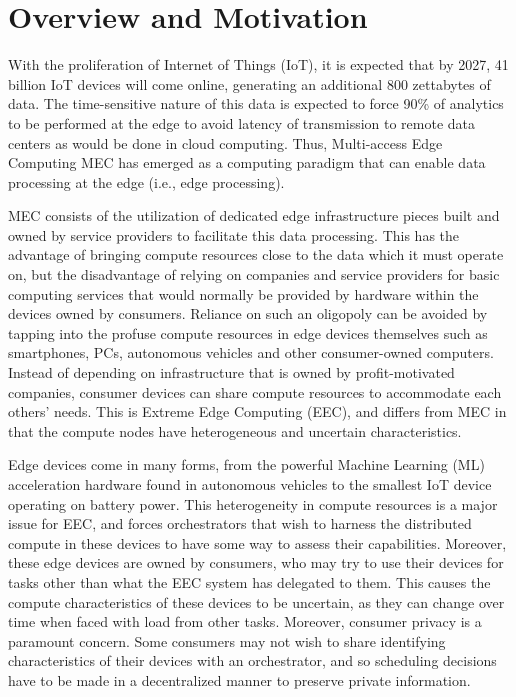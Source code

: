 \section{Overview and Motivation}

With the proliferation of Internet of Things (IoT), it is expected that by 2027, 41 billion IoT devices will come online, generating an additional 800 zettabytes of data. The time-sensitive nature of this data is expected to force 90\% of analytics to be performed at the edge to avoid latency of transmission to remote data centers as would be done in cloud computing. Thus, Multi-access Edge Computing MEC has emerged as a computing paradigm that can enable data processing at the edge (i.e., edge processing).

MEC consists of the utilization of dedicated edge infrastructure pieces built and owned by service providers to facilitate this data processing. This has the advantage of bringing compute resources close to the data which it must operate on, but the disadvantage of relying on companies and service providers for basic computing services that would normally be provided by hardware within the devices owned by consumers. Reliance on such an oligopoly can be avoided by tapping into the profuse compute resources in edge devices themselves such as smartphones, PCs, autonomous vehicles and other consumer-owned computers. Instead of depending on infrastructure that is owned by profit-motivated companies, consumer devices can share compute resources to accommodate each others’ needs. This is Extreme Edge Computing (EEC), and differs from MEC in that the compute nodes have heterogeneous and uncertain characteristics.

Edge devices come in many forms, from the powerful Machine Learning (ML) acceleration hardware found in autonomous vehicles to the smallest IoT device operating on battery power. This heterogeneity in compute resources is a major issue for EEC, and forces orchestrators that wish to harness the distributed compute in these devices to have some way to assess their capabilities. Moreover, these edge devices are owned by consumers, who may try to use their devices for tasks other than what the EEC system has delegated to them. This causes the compute characteristics of these devices to be uncertain, as they can change over time when faced with load from other tasks. Moreover, consumer privacy is a paramount concern. Some consumers may not wish to share identifying characteristics of their devices with an orchestrator, and so scheduling decisions have to be made in a decentralized manner to preserve private information.

